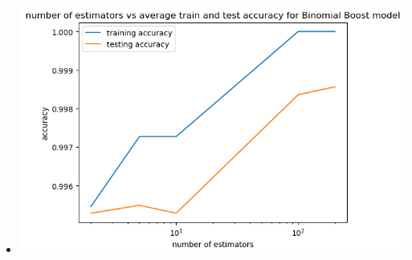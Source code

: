 \documentclass{article}
\theoremstyle{plain}
\theoremstyle{definition}
\begin{document}
\begin{enumerate}
 \begin{itemize}
           \color{blue}
               \item \includegraphics[width=15cm]{homework/homework_6/images/hw6_5.png}
\end{itemize}

\setcounter{saveenum}{\value{enumi}}
\end{enumerate}
\end{document}
